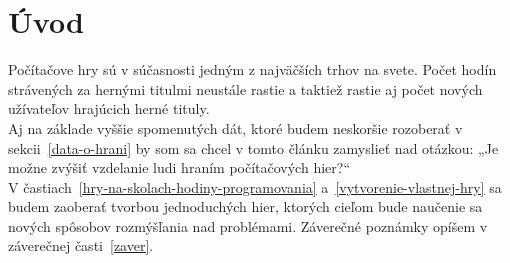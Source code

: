 \section{Úvod}
Počítačove hry sú v súčasnosti jedným z najväčších trhov na svete. Počet hodín strávených 
za hernými titulmi neustále rastie a taktiež rastie aj počet nových užívateľov hrajúcich 
herné tituly.\\ 
Aj na základe vyššie spomenutých dát, ktoré budem neskoršie rozoberať v 
sekcii~\ref{data-o-hrani} by som sa chcel v tomto článku zamyslieť nad otázkou: 
„Je možne zvýšiť vzdelanie ludi hraním počítačových hier?“\\ 
V častiach~\ref{hry-na-skolach-hodiny-programovania} a~\ref{vytvorenie-vlastnej-hry} sa budem zaoberať 
tvorbou jednoduchých hier, ktorých cieľom bude naučenie sa nových spôsobov rozmýšľania nad problémami.
Záverečné poznámky opíšem v záverečnej časti~\ref{zaver}.